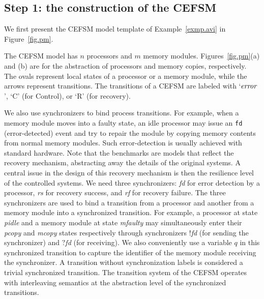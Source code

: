\subsection*{Step 1: the construction of the CEFSM}
We first present the CEFSM model template 
of Example~\ref{exmp.avi} in Figure~\ref{fig.pm}. 
\begin{figure*}[t] 
\begin{center} 
\caption{CEFSM templates of $n$ processors and $m$ memory copies}
\label{fig.pm}
\end{center} 
\end{figure*}
The CEFSM model has $n$ processors and $m$ memory modules. 
Figures~\ref{fig.pm}(a) and (b) are 
for the abstraction of processors and memory copies, respectively.  
The ovals represent local states of a processor or a 
memory module, while the arrows represent transitions. 
The transitions of a CEFSM are labeled with `$\textit{error}$', 
`C' (for Control), or `R' (for recovery).  

We also use synchronizers to bind process transitions. 
For example, when a memory module moves into a faulty state, 
an idle processor may issue an {\tt fd} (error-detected) event
and try to repair the module by copying memory contents from 
normal memory modules.  
Such error-detection is usually achieved with standard hardware.  
Note that the benchmarks are models that reflect the 
recovery mechanism, abstracting away the details of the original systems.  
A central issue in the design of this recovery mechanism is then 
the resilience level of the controlled systems.  
We need three synchronizers: 
\textit{fd} for error detection by a processor, 
\textit{rs} for recovery success, 
and \textit{rf} for recovery failure.  
The three synchronizers are used to bind a transition from a processor 
and another from a memory module into a synchronized transition.  
For example, a processor at state \textit{pidle} and 
a memory module at state 
\textit{mfaulty} may simultaneously enter their 
\textit{pcopy} and \textit{mcopy} states respectively
through synchronizers $!$\textit{fd} (for sending the synchronizer) 
and $?$\textit{fd} (for receiving). 
We also conveniently use a variable $q$ in this synchronized 
transition to capture the identifier of the memory module receiving 
the synchronizer.  
A transition without synchronization labels is considered a trivial 
synchronized transition.  
The transition system of the CEFSM operates with interleaving semantics 
at the abstraction level of the synchronized transitions. 

